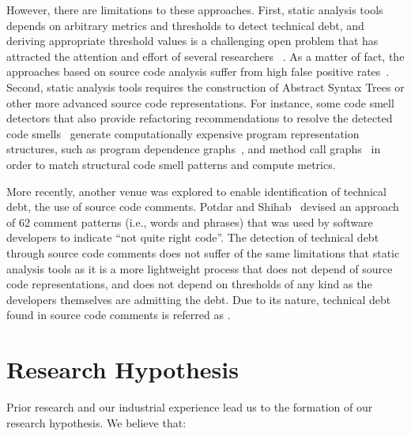 However, there are limitations to these approaches. First, static analysis tools depends on arbitrary metrics and thresholds to detect technical debt, and deriving appropriate threshold values is a challenging open problem that has attracted the attention and effort of several researchers ~\cite{Oliveira2014CSMR,Fontana2015WETSoM,Fontana2015EMSE}. As a matter of fact, the approaches based on source code analysis suffer from high false positive rates~\cite{Fontana2016SANER}. Second, static analysis tools requires the construction of Abstract Syntax Trees or other more advanced source code representations. For instance, some code smell detectors that also provide refactoring recommendations to resolve the detected code smells~\cite{Tsantalis2011TSE,Tsantalis2015TSE} generate computationally expensive program representation structures, such as program dependence graphs~\cite{Graf2010SCAM}, and method call graphs~\cite{Ali2012ECOOP} in order to match structural code smell patterns and compute metrics.

More recently, another venue was explored to enable identification of technical debt, the use of source code comments. Potdar and Shihab~\cite{Potdar2014ICSME} devised an approach of 62 comment patterns (i.e., words and phrases) that was used by software developers to indicate ``not quite right code''. The detection of technical debt through source code comments does not suffer of the same limitations that static analysis tools as it is a more lightweight process that does not depend of source code representations, and does not depend on thresholds of any kind as the developers themselves are admitting the debt. Due to its nature, technical debt found in source code comments is referred as \emph{\SATD}.



\section{Research Hypothesis}

Prior research and our industrial experience lead us to the formation of our research hypothesis. We believe that:


